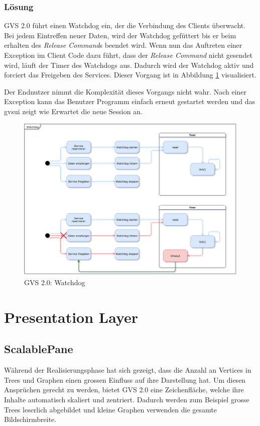 \documentclass[11pt,a4paper,english,oneside]{book}
\numberwithin{equation}{chapter}
\begin{document}
	\subsubsection{Lösung}
	GVS 2.0 führt einen Watchdog ein, der die Verbindung des Clients überwacht. Bei jedem Eintreffen neuer Daten, wird der Watchdog gefüttert bis er beim erhalten des \textit{Release Command}s beendet wird. Wenn nun das Auftreten einer Exception im Client Code dazu führt, dass der \textit{Release Command} nicht gesendet wird, läuft der Timer des Watchdogs aus. Dadurch wird der Watchdog aktiv und forciert das Freigeben des Services. Dieser Vorgang ist in Abbildung \ref{fig:watchdog} visualisiert.
	
	Der Endnutzer nimmt die Komplexität dieses Vorgangs nicht wahr. Nach einer Exception kann das Benutzer Programm einfach erneut gestartet werden und das \gls{gvsui} zeigt wie Erwartet die neue Session an.
	
	\begin{figure}[h!]
		\centering
		\includegraphics[width=0.7\linewidth]{assets/images/watchdog}
		\caption{GVS  2.0: Watchdog}
		\label{fig:watchdog}
	\end{figure}
	
	
	\section{Presentation Layer}
	
	\subsection{ScalablePane}
	Während der Realisierungsphase hat sich gezeigt, dass die Anzahl an Vertices in Trees und Graphen einen grossen Einfluss auf ihre Darstellung hat. Um diesen Ansprüchen gerecht zu werden, bietet GVS 2.0 eine Zeichenfläche, welche ihre Inhalte automatisch skaliert und zentriert. Dadurch werden zum Beispiel grosse Trees leserlich abgebildet und kleine Graphen verwenden die gesamte Bildschirmbreite. 
	
\end{document}
